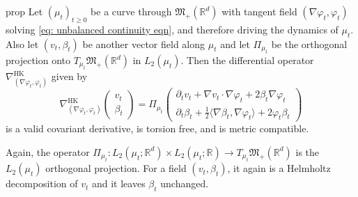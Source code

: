 \documentclass[11pt]{article}
\newcommand{\posm}{\mathfrak{M}_+(\mathbb{R}^d)}
\begin{document}
\begin{restatable}{prop}{} \label{HK covariant deriv}
    Let $(\mu_t)_{t\geq 0}$ be a curve through $\posm$ with tangent field $(\nabla \varphi_t, \varphi_t)$ solving \cref{eq: unbalanced continuity eqn}, and therefore driving the dynamics of $\mu_t$. Also let $(v_t, \beta_t)$ be another vector field along $\mu_t$ and let $\Pi_{\mu_t}$ be the orthogonal projection onto $T_{\mu_t}\posm$ in $L_2(\mu_t)$. Then the differential operator $\nabla_{(\nabla\varphi_t, \varphi_t)}^{\text{HK}}$ given by
    \begin{equation*}
        \nabla_{(\nabla\varphi_t, \varphi_t)}^{\text{HK}} \begin{pmatrix}
            v_t \\
            \beta_t
        \end{pmatrix} = \Pi_{\mu_t}\begin{pmatrix}
            \partial_t v_t + \nabla v_t \cdot \nabla \varphi_t + 2\beta_t\nabla\varphi_t \\
            \partial_t \beta_t + \frac{1}{2}\langle \nabla \beta_t, \nabla \varphi_t\rangle + 2\varphi_t\beta_t
        \end{pmatrix}
    \end{equation*}
    is a valid covariant derivative, is torsion free, and is metric compatible. 
\end{restatable}

Again, the operator $\Pi_{\mu_t}: L_2(\mu_t; \mathbb{R}^d) \times L_2(\mu_t; \mathbb{R}) \rightarrow T_{\mu_t}\mathfrak{M}_+(\mathbb{R}^d)$ is 
the $L_2(\mu_t)$ orthogonal projection. For a field $(v_t, \beta_t)$, it again is a Helmholtz decomposition of $v_t$ and it leaves $\beta_t$ unchanged. 
\\
\end{document}
